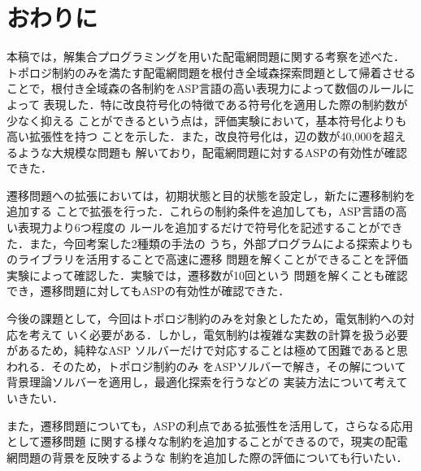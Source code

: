 \section{おわりに}\label{chap:conc}

本稿では，解集合プログラミングを用いた配電網問題に関する考察を述べた．
トポロジ制約のみを満たす配電網問題を根付き全域森探索問題として帰着させる
ことで，根付き全域森の各制約をASP言語の高い表現力によって数個のルールによって
表現した．特に改良符号化の特徴である符号化を適用した際の制約数が少なく抑える
ことができるという点は，評価実験において，基本符号化よりも高い拡張性を持つ
ことを示した．また，改良符号化は，辺の数が40,000を超えるような大規模な問題も
解いており，配電網問題に対するASPの有効性が確認できた．

遷移問題への拡張においては，初期状態と目的状態を設定し，新たに遷移制約を追加する
ことで拡張を行った．これらの制約条件を追加しても，ASP言語の高い表現力より6つ程度の
ルールを追加するだけで符号化を記述することができた．また，今回考案した2種類の手法の
うち，外部プログラムによる探索よりも\clingo のライブラリを活用することで高速に遷移
問題を解くことができることを評価実験によって確認した．実験では，遷移数が10回という
問題を解くことも確認でき，遷移問題に対してもASPの有効性が確認できた．

今後の課題として，今回はトポロジ制約のみを対象としたため，電気制約への対応を考えて
いく必要がある．しかし，電気制約は複雑な実数の計算を扱う必要があるため，純粋なASP
ソルバーだけで対応することは極めて困難であると思われる．そのため，トポロジ制約のみ
をASPソルバーで解き，その解について背景理論ソルバーを適用し，最適化探索を行うなどの
実装方法について考えていきたい．

また，遷移問題についても，ASPの利点である拡張性を活用して，さらなる応用として遷移問題
に関する様々な制約を追加することができるので，現実の配電網問題の背景を反映するような
制約を追加した際の評価についても行いたい．
